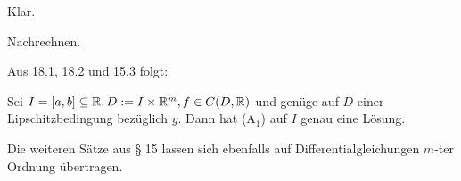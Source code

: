 \documentclass{article}
\begin{document}
\begin{beweis}
\begin{liste}
\item Klar.
\item Nachrechnen.
\end{liste}
\end{beweis}

Aus 18.1, 18.2 und 15.3 folgt:

\begin{satz}
Sei $I=[a,b] \subseteq \mathbb{R}, D:=I\times \mathbb{R}^m, f \in C(D,\mathbb{R})$ und genüge auf $D$ einer Lipschitzbedingung bezüglich $y$. Dann hat (A$_1$) auf $I$ genau eine Lösung.
\end{satz}

\begin{bemerkung}
Die weiteren Sätze aus § 15 lassen sich ebenfalls auf Differentialgleichungen $m$-ter Ordnung übertragen.
\end{bemerkung}
\end{document}
